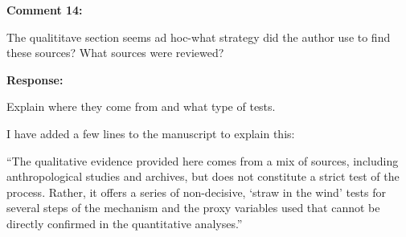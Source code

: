 \documentclass[12pt, a4paper, notitlepage]{article}
\begin{document}
\vspace{15pt}
\noindent\textbf{Comment 14:}
\begin{displayquote}
The qualititave section seems ad hoc-what strategy did the author use to find these sources? What sources were reviewed?
\end{displayquote}


\noindent\textbf{Response:}

Explain where they come from and what type of tests.

I have added a few lines to the manuscript to explain this:

``The qualitative evidence provided here comes from a mix of sources, including anthropological studies and archives, but does not constitute a strict test of the process.
Rather, it offers a series of non-decisive, `straw in the wind' tests \citep{Collier:2011ve} for several steps of the mechanism and the proxy variables used that cannot be directly confirmed in the quantitative analyses.''

\newpage


\end{document}
